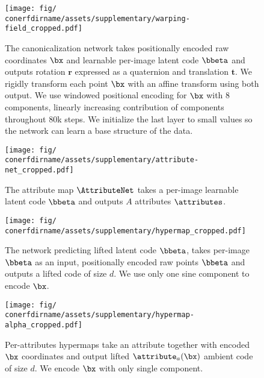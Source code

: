   \begin{figure}
    \centering
    \texttt{[image: fig/\\conerfdirname/assets/supplementary/warping-field\_cropped.pdf]}
    \caption{The canonicalization network takes positionally encoded raw coordinates $\bx$ and learnable per-image latent code $\bbeta$ and outputs rotation $\mathbf{r}$ expressed as a quaternion and translation $\mathbf{t}$.
      We rigidly transform each point $\bx$ with an affine transform using
      both output.
      We use windowed positional encoding \cite{park2020deformable} for $\bx$
      with 8 components, linearly increasing contribution of components
      throughout 80k steps.
      We initialize the last layer to small values so the network can learn a
      base structure of the data.
    }
    \label{fig:conerf-warping-field}
  \end{figure}

  \begin{figure}
    \centering
    \texttt{[image: fig/\\conerfdirname/assets/supplementary/attribute-net\_cropped.pdf]}
    \caption{The attribute map $\AttributeNet$ takes a per-image learnable latent code $\bbeta$ and outputs $A$ attributes $\attributes$.}
    \label{fig:conerf-attribute-net}
  \end{figure}

  \begin{figure}
    \centering
    \texttt{[image: fig/\\conerfdirname/assets/supplementary/hypermap\_cropped.pdf]}
    \caption{The network predicting lifted latent code $\bbeta$, takes per-image $\bbeta$ as an input, positionally encoded raw points $\bbeta$ and outputs a lifted code of size $d$.
      We use only one sine component to encode $\bx$.
    }
    \label{fig:conerf-hypermap}
  \end{figure}

  \begin{figure}
    \centering
    \texttt{[image: fig/\\conerfdirname/assets/supplementary/hypermap-alpha\_cropped.pdf]}
    \caption{Per-attributes hypermaps take an attribute together with encoded $\bx$ coordinates and output lifted $\attribute_a(\bx)$ ambient code of size $d$.
      We encode $\bx$ with only single component.
    }
    \label{fig:conerf-hypermap-alpha}
  \end{figure}

